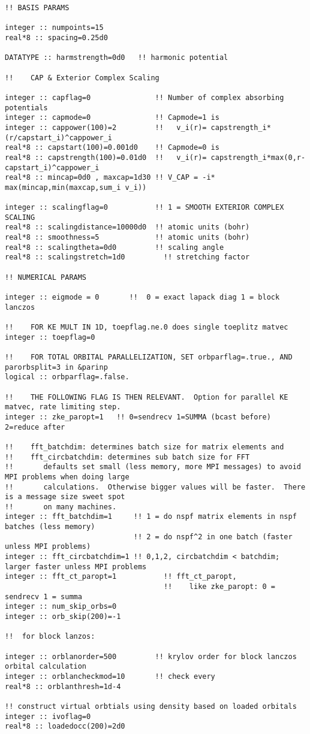 \begin{verbatim}
!! BASIS PARAMS

integer :: numpoints=15
real*8 :: spacing=0.25d0

DATATYPE :: harmstrength=0d0   !! harmonic potential

!!    CAP & Exterior Complex Scaling

integer :: capflag=0               !! Number of complex absorbing potentials
integer :: capmode=0               !! Capmode=1 is 
integer :: cappower(100)=2         !!   v_i(r)= capstrength_i*(r/capstart_i)^cappower_i
real*8 :: capstart(100)=0.001d0    !! Capmode=0 is    
real*8 :: capstrength(100)=0.01d0  !!   v_i(r)= capstrength_i*max(0,r-capstart_i)^cappower_i
real*8 :: mincap=0d0 , maxcap=1d30 !! V_CAP = -i* max(mincap,min(maxcap,sum_i v_i))

integer :: scalingflag=0           !! 1 = SMOOTH EXTERIOR COMPLEX SCALING
real*8 :: scalingdistance=10000d0  !! atomic units (bohr)
real*8 :: smoothness=5             !! atomic units (bohr)
real*8 :: scalingtheta=0d0         !! scaling angle
real*8 :: scalingstretch=1d0         !! stretching factor

!! NUMERICAL PARAMS

integer :: eigmode = 0       !!  0 = exact lapack diag 1 = block lanczos

!!    FOR KE MULT IN 1D, toepflag.ne.0 does single toeplitz matvec
integer :: toepflag=0

!!    FOR TOTAL ORBITAL PARALLELIZATION, SET orbparflag=.true., AND parorbsplit=3 in &parinp
logical :: orbparflag=.false.

!!    THE FOLLOWING FLAG IS THEN RELEVANT.  Option for parallel KE matvec, rate limiting step.
integer :: zke_paropt=1   !! 0=sendrecv 1=SUMMA (bcast before) 2=reduce after

!!    fft_batchdim: determines batch size for matrix elements and 
!!    fft_circbatchdim: determines sub batch size for FFT 
!!       defaults set small (less memory, more MPI messages) to avoid MPI problems when doing large 
!!       calculations.  Otherwise bigger values will be faster.  There is a message size sweet spot
!!       on many machines.
integer :: fft_batchdim=1     !! 1 = do nspf matrix elements in nspf batches (less memory)
                              !! 2 = do nspf^2 in one batch (faster unless MPI problems)
integer :: fft_circbatchdim=1 !! 0,1,2, circbatchdim < batchdim; larger faster unless MPI problems
integer :: fft_ct_paropt=1           !! fft_ct_paropt,
                                     !!    like zke_paropt: 0 = sendrecv 1 = summa
integer :: num_skip_orbs=0
integer :: orb_skip(200)=-1

!!  for block lanzos:

integer :: orblanorder=500         !! krylov order for block lanczos orbital calculation
integer :: orblancheckmod=10       !! check every
real*8 :: orblanthresh=1d-4

!! construct virtual orbtials using density based on loaded orbitals
integer :: ivoflag=0
real*8 :: loadedocc(200)=2d0
\end{verbatim}
